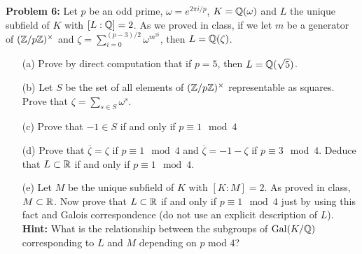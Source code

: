 \documentclass[12pt]{article}
\begin{document}
\skv
{\bf Problem 6:} Let $p$ be an odd prime, $\omega=e^{2\pi i/p}$, $K={\mathbb Q}(\omega)$
and $L$ the unique subfield of $K$ with $[L:{\mathbb Q}]=2$. As we proved in class, if we let
$m$ be a generator of $({\mathbb Z}/p{\mathbb Z})^{\times}$ and $\zeta=\sum_{i=0}^{(p-3)/2} \omega^{m^{2i}}$,
then $L={\mathbb Q}(\zeta)$.
\begin{itemize}
\item[(a)] Prove by direct computation that if $p=5$, then $L={\mathbb Q}(\sqrt{5})$.
\item[(b)] Let $S$ be the set of all elements of $({\mathbb Z}/p{\mathbb Z})^{\times}$ representable 
as squares. Prove that $\zeta=\sum_{s\in S}\omega^s$.
\item[(c)] Prove that $-1\in S$ if and only if $p\equiv 1\mod 4$
\item[(d)] Prove that $\overline\zeta=\zeta$ if $p\equiv 1\mod 4$ and $\overline\zeta=-1-\zeta$
if $p\equiv 3\mod 4$. Deduce that $L\subset {\mathbb R}$ if and only if $p\equiv 1\mod 4$.
\item[(e)] Let $M$ be the unique subfield of $K$ with $[K:M]=2$. As proved in class,
$M\subset {\mathbb R}$. Now prove that $L\subset {\mathbb R}$ if and only if $p\equiv 1\mod 4$ just 
by using this fact and Galois correspondence (do not use an explicit description of $L$).
{\bf Hint:} What is the relationship between the subgroups of ${\rm Gal}(K/{\mathbb Q})$ corresponding
to $L$ and $M$ depending on $p$ mod $4$?
\end{itemize} 
\end{document}
